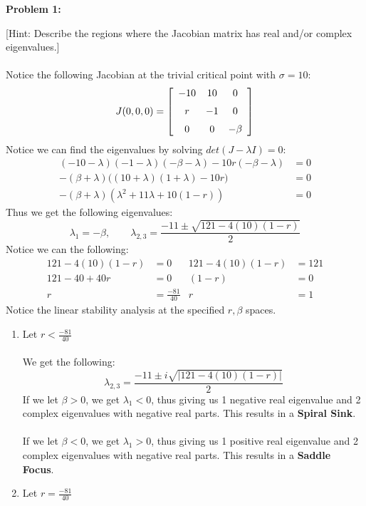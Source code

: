 \documentclass[11pt]{article}
\newcommand{\spacer}{\noalign{\medskip}}
\newenvironment{problem}[1]{\textbf{Problem #1: }}{\newpage}
\begin{document}
\begin{problem}{1}
\begin{enumerate}[label = (\alph*)]
	 		{[Hint:  Describe the regions where the Jacobian matrix has real and/or
	 		complex eigenvalues.]} 
 			\\ \\
 			Notice the following Jacobian at the trivial critical point with $\sigma = 10$:
 			\[J(0,0,0) = \left[ \begin{array}{ccc}
 				-10 & 10 & 0 \\
 				\spacer r & -1 & 0 \\
 				\spacer 0 & 0 & -\beta
 			\end{array}\right]\]
 			Notice we can find the eigenvalues by solving $det(J - \lambda I) = 0$:
 			\begin{align*}
 				(-10 - \lambda)(-1 - \lambda)(-\beta - \lambda) - 10r(-\beta - \lambda) &= 0 \\
 				-(\beta + \lambda)\bigg((10 + \lambda)(1 + \lambda) - 10r\bigg) &= 0 \\
 				-(\beta + \lambda)(\lambda^2 + 11\lambda + 10(1 - r)) &= 0 
 			\end{align*}
 			Thus we get the following eigenvalues:
 			\[\lambda_1 = -\beta, \qquad \lambda_{2,3} = \frac{-11 \pm \sqrt{121 - 4(10)(1-r)}}{2}\]
 			\newpage
 			Notice we can the following:
 			\begin{align*}
 				121 - 4(10)(1 - r) &= 0 & 121 - 4(10)(1 - r) &= 121 \\
 				121 - 40 + 40r &= 0 & (1 - r) &= 0 \\
 				r &= \frac{-81}{40} & r &= 1
 			\end{align*}
 			Notice the linear stability analysis at the specified $r,\beta$ spaces.
 			\begin{enumerate}[label = (\alph*)]
 				\item Let $r < \frac{-81}{40}$
 				\\ \\
 				We get the following:
 				\[\lambda_{2,3} = \frac{-11 \pm i\sqrt{|121 - 4(10)(1-r)|}}{2}\]
 				If we let $\beta > 0$, we get $\lambda_1 < 0$, thus giving us 1 negative real eigenvalue and 2 complex eigenvalues with negative real parts.  This results in a \textbf{Spiral Sink}.
 				\\ \\
 				If we let $\beta < 0$, we get $\lambda_1 > 0$, thus giving us 1 positive real eigenvalue and 2 complex eigenvalues with negative real parts.  This results in a \textbf{Saddle Focus}.
 				\\ 
 				\item Let $r = \frac{-81}{40}$

\end{enumerate}
\end{enumerate}
\end{problem}
\end{document}
